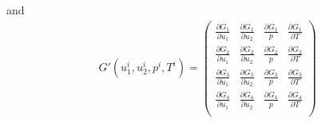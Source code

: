 \documentclass{article}
\begin{document}
and 
 \begin{align*}
G'(u_1^i,u_2^i,p^i,T^i) = \begin{pmatrix}
\frac{\partial G_1}{\partial u_1}&\frac{\partial G_1}{\partial u_2}&\frac{\partial G_1}{p}&\frac{\partial G_1}{\partial T}\\
\frac{\partial G_2}{\partial u_1}&\frac{\partial G_2}{\partial u_2}&\frac{\partial G_2}{p}&\frac{\partial G_2}{\partial T}\\
\frac{\partial G_3}{\partial u_1}&\frac{\partial G_3}{\partial u_2}&\frac{\partial G_3}{p}&\frac{\partial G_3}{\partial T}\\
\frac{\partial G_4}{\partial u_1}&\frac{\partial G_4}{\partial u_2}&\frac{\partial G_4}{p}&\frac{\partial G_4}{\partial T}\\
\end{pmatrix}
 \end{align*}
\end{document}
